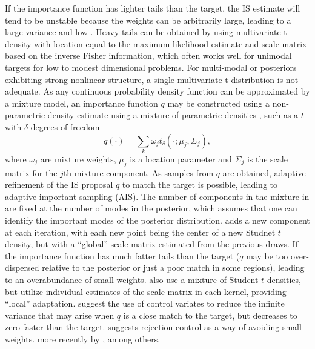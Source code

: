 If the importance function has lighter tails than the target, the IS
estimate will tend to be unstable because the weights can be
arbitrarily large, leading to a large variance and low \ESS.  Heavy
tails can be obtained by using multivariate t density with location
equal to the maximum likelihood estimate and scale matrix based on the
inverse Fisher information, which often works well for unimodal
targets for low to modest dimensional problems. For multi-modal or
posteriors exhibiting strong nonlinear structure, a single
multivariate t distribution is not adequate.  As any continuous probability density
function can be approximated by a  mixture model, an importance
function $q$  may be constructed using a non-parametric density
estimate using a 
mixture of parametric densities
\citep{Oh:Berg:1992,Oh:Berg:1993,West:1993}, such as a 
  $t$ with $\delta$ degrees of freedom
\begin{equation}
  \label{eq:mixIS}
  q(\cdot) = \sum_k \omega_j t_\delta(\cdot; \mu_j, \Sigma_j),
\end{equation}
where $\omega_j$ are mixture weights, $\mu_j$ is a location parameter
and $\Sigma_j$ is the scale matrix for the $j$th mixture
component.    As samples from $q$ are
obtained, adaptive refinement of the IS proposal $q$ to match the
target is possible, leading to adaptive important sampling (AIS).  The
number of components in the mixture in \citeauthor{Oh:Berg:1993} are
fixed at the number of modes in the posterior, which
assumes that one can identify the  important modes of the posterior
distribution.  \citeauthor{West:1993} adds a  new component at each
iteration,  with each new point being the center of a new Studnet $t$
density, but with a ``global'' scale matrix estimated from  the
previous draws.  If
the importance function has much fatter tails than the target ($q$ may
be too over-dispersed relative to the posterior or just a poor match
in some regions), leading to an overabundance of small weights.
\citet{Give:Raft:1996} also use a mixture of Student $t$ densities,
but utilize individual estimates of the scale matrix in each kernel,
providing ``local'' adaptation. \citet{Owen:Zhou:2000} suggest the use of control
variates  to reduce the infinite variance
that may arise when $q$ is a close match to the target, but decreases
to zero faster than the target.  \citet{Liu:2001} suggests rejection
control as a way of avoiding small weights. 
more recently by \citet{Douc:Guil:Mari:Robe:2006}, among others.

